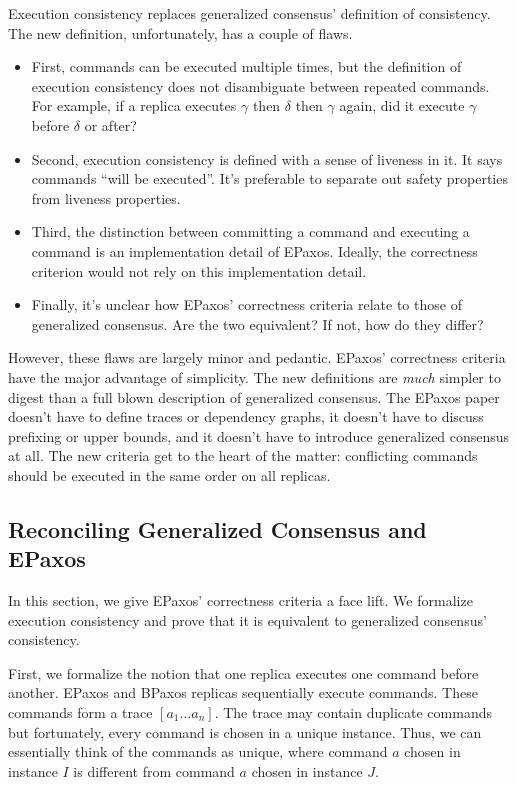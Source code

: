 Execution consistency replaces generalized consensus' definition of
consistency. The new definition, unfortunately, has a couple of flaws.
\begin{itemize}
  \item
    First, commands can be executed multiple times, but the definition of
    execution consistency does not disambiguate between repeated commands.
    For example, if a replica executes $\gamma$ then $\delta$ then $\gamma$
    again, did it execute $\gamma$ before $\delta$ or after?
  \item
    Second, execution consistency is defined with a sense of liveness in it.
    It says commands ``will be executed''. It's preferable to separate out
    safety properties from liveness properties.
  \item
    Third, the distinction between committing a command and executing a command
    is an implementation detail of EPaxos. Ideally, the correctness criterion
    would not rely on this implementation detail.
  \item
    Finally, it's unclear how EPaxos' correctness criteria relate to those of
    generalized consensus. Are the two equivalent? If not, how do they differ?
\end{itemize}

However, these flaws are largely minor and pedantic.  EPaxos' correctness
criteria have the major advantage of simplicity.  The new definitions are
\emph{much} simpler to digest than a full blown description of generalized
consensus. The EPaxos paper doesn't have to define traces or dependency graphs,
it doesn't have to discuss prefixing or upper bounds, and it doesn't have to
introduce generalized consensus at all. The new criteria get to the heart of
the matter: conflicting commands should be executed in the same order on all
replicas.

\subsection{Reconciling Generalized Consensus and EPaxos}
In this section, we give EPaxos' correctness criteria a face lift. We formalize
execution consistency and prove that it is equivalent to generalized consensus'
consistency.

\newcommand{\happensbefore}{<}
\newcommand{\couldhappenbefore}{<_?}
First, we formalize the notion that one replica executes one command before
another. EPaxos and BPaxos replicas sequentially execute commands. These
commands form a trace $[a_1 \ldots a_n]$. The trace may contain duplicate
commands but fortunately, every command is chosen in a unique instance. Thus,
we can essentially think of the commands as unique, where command $a$ chosen in
instance $I$ is different from command $a$ chosen in instance $J$.

